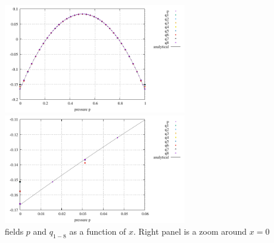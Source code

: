 \begin{center}
\includegraphics[width=8cm]{python_codes/fieldstone_12/results/reg/pressure}
\includegraphics[width=8cm]{python_codes/fieldstone_12/results/reg/pressure_left}\\
{\captionfont fields $p$ and $q_{1-8}$ as a function of $x$. Right panel 
is a zoom around $x=0$}
\end{center}


